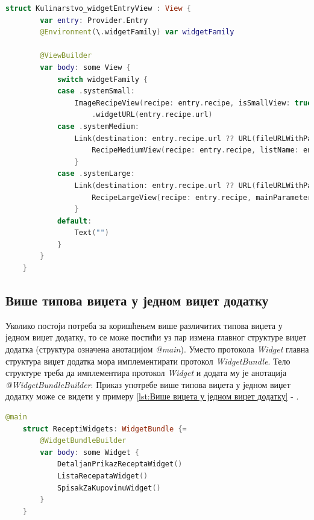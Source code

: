 \documentclass[12pt,oneside]{memoir}
\begin{document}
\begin{lstlisting}[caption=\textit{{Везе унутар виџета}}, label={lst:Везе унутар виџета}, language=Swift, frame=single]
    struct Kulinarstvo_widgetEntryView : View {
        var entry: Provider.Entry
        @Environment(\.widgetFamily) var widgetFamily
        
        @ViewBuilder
        var body: some View {
            switch widgetFamily {
            case .systemSmall:
                ImageRecipeView(recipe: entry.recipe, isSmallView: true)
                    .widgetURL(entry.recipe.url)
            case .systemMedium:
                Link(destination: entry.recipe.url ?? URL(fileURLWithPath: "")) {
                    RecipeMediumView(recipe: entry.recipe, listName: entry.parameterToShow)
                }
            case .systemLarge:
                Link(destination: entry.recipe.url ?? URL(fileURLWithPath: "")) {
                    RecipeLargeView(recipe: entry.recipe, mainParameter: entry.parameterToShow)
                }
            default:
                Text("")
            }
        }
    }
\end{lstlisting}

\subsection{Више типова виџета у једном виџет додатку}
\indent Уколико постоји потреба за коришћењем више различитих типова виџета у једном виџет додатку, то се може постићи уз пар измена главног структуре виџет додатка (структура означена анотацијом \textit{@main}). Уместо протокола \textit{Widget} главна структура виџет додатка мора имплементирати протокол \textit{WidgetBundle}. Тело структуре треба да имплементира протокол \textit{Widget} и додата му је анотација \textit{@WidgetBundleBuilder}. Приказ употребе више типова виџета у једном виџет додатку може се видети у примеру \ref{lst:Више виџета у једном виџет додатку} - .

\begin{lstlisting}[caption=\textit{{Више виџета у једном виџет додатку}}, label={lst:Више виџета у једном виџет додатку}, language=Swift, frame=single]
    @main
    struct ReceptiWidgets: WidgetBundle {=
        @WidgetBundleBuilder
        var body: some Widget {
            DetaljanPrikazReceptaWidget()
            ListaRecepataWidget()
            SpisakZaKupovinuWidget()
        }
    }
\end{lstlisting}
\end{document}
